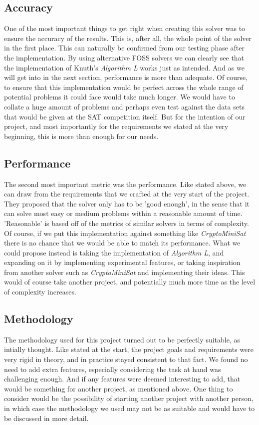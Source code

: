 \documentclass{article}
\begin{document}
\subsection{Accuracy}
One of the most important things to get right when creating this solver was to ensure the accuracy of the results. This is, after
all, the whole point of the solver in the first place. This can naturally be confirmed from our testing phase after the
implementation. By using alternative FOSS solvers we can clearly see that the implementation of Knuth's \textit{Algorithm L} works
just as intended. And as we will get into in the next section, performance is more than adequate. Of course, to ensure that this
implementation would be perfect across the whole range of potential problems it could face would take much longer. We would have
to collate a huge amount of problems and perhaps even test against the data sets that would be given at the SAT competition
itself. But for the intention of our project, and most importantly for the requirements we stated at the very beginning, this is
more than enough for our needs.

\subsection{Performance}
The second most important metric was the performance. Like stated above, we can draw from the requirements that we crafted at the
very start of the project. They proposed that the solver only has to be 'good enough', in the sense that it can solve most easy or
medium problems within a reasonable amount of time. 'Reasonable' is based off of the metrics of similar solvers in terms of
complexity. Of course, if we put this implementation against something like \textit{CryptoMiniSat} there is no chance that we
would be able to match its performance. What we could propose instead is taking the implementation of \textit{Algorithm L}, and
expanding on it by implementing experimental features, or taking inspiration from another solver such as \textit{CryptoMiniSat}
and implementing their ideas. This would of course take another project, and potentially much more time as the level of complexity
increases.

\subsection{Methodology}
The methodology used for this project turned out to be perfectly suitable, as intially thought. Like stated at the start, the
project goals and requirements were very rigid in theory, and in practice stayed consistent to that fact. We found no need to add
extra features, especially considering the task at hand was challenging enough. And if any features were deemed interesting to
add, that would be something for another project, as mentioned above. One thing to consider would be the possibility of starting
another project with another person, in which case the methodology we used may not be as suitable and would have to be discussed
in more detail.
\end{document}
